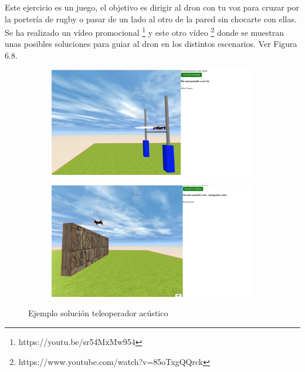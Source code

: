 Este ejercicio es un juego, el objetivo es dirigir al dron con tu voz para cruzar por la portería de rugby o pasar de un lado al otro de la pared sin chocarte con ellas. Se ha realizado un vídeo promocional \footnote{https://youtu.be/sr54MxMw954} y este otro vídeo \footnote{https://www.youtube.com/watch?v=85oTxgQQrck} donde se muestran unas posibles soluciones para guiar al dron en los distintos escenarios. Ver Figura 6.8.

 \begin{figure}[H]
  \begin{subfigure}[b]{0.5\textwidth}
  \centering
    \includegraphics[width=1\textwidth, height=0.7\textwidth]{chapters/images/solucionaudio.png}
    \caption{}
    \label{fig:f1}
  \end{subfigure}
  \hfill
  \begin{subfigure}[b]{0.5\textwidth}
  \centering
    \includegraphics[width=1\textwidth, height=0.7\textwidth]{chapters/images/solucionaudio2.png}
	\caption{}    
    \label{fig:f2}
 
  \end{subfigure}
  \caption{Ejemplo solución teleoperador acústico}
\end{figure}


